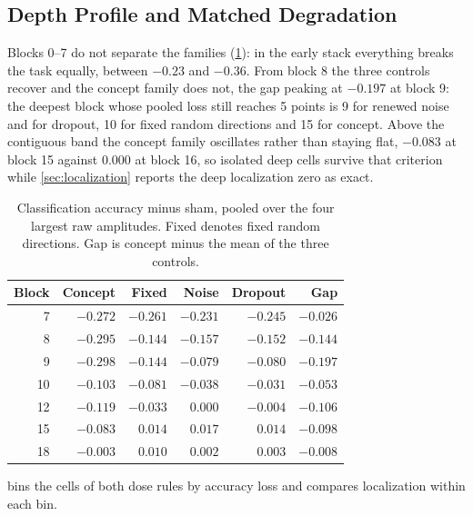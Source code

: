 \subsection{Depth Profile and Matched Degradation}
\label{app:deg-depth}

Blocks 0--7 do not separate the families (\cref{tab:app-deg-depth}): in the
early stack everything breaks the task equally, between $-0.23$ and $-0.36$.
From block 8 the three controls recover and the concept family does not, the
gap peaking at $-0.197$ at block 9: the deepest block whose pooled loss still
reaches 5 points is 9 for renewed noise and for dropout, 10 for fixed random
directions and 15 for concept. Above the contiguous band the concept family
oscillates rather than staying flat, $-0.083$ at block 15 against $0.000$ at
block 16, so isolated deep cells survive that criterion while
\cref{sec:localization} reports the deep localization zero as exact.

\begin{table}[H]
\centering
\small
\begin{tabular}{rrrrrr}
\toprule
Block & Concept & Fixed & Noise & Dropout & Gap \\
\midrule
7  & $-0.272$ & $-0.261$ & $-0.231$ & $-0.245$ & $-0.026$ \\
8  & $-0.295$ & $-0.144$ & $-0.157$ & $-0.152$ & $-0.144$ \\
9  & $-0.298$ & $-0.144$ & $-0.079$ & $-0.080$ & $-0.197$ \\
10 & $-0.103$ & $-0.081$ & $-0.038$ & $-0.031$ & $-0.053$ \\
12 & $-0.119$ & $-0.033$ & $0.000$  & $-0.004$ & $-0.106$ \\
15 & $-0.083$ & $0.014$  & $0.017$  & $0.014$  & $-0.098$ \\
18 & $-0.003$ & $0.010$  & $0.002$  & $0.003$  & $-0.008$ \\
\bottomrule
\end{tabular}
\caption{Classification accuracy minus sham, pooled over the four largest raw
amplitudes. Fixed denotes fixed random directions. Gap is concept minus the
mean of the three controls.}
\label{tab:app-deg-depth}
\end{table}

 bins the cells of both dose rules by accuracy loss
and compares localization within each bin.


